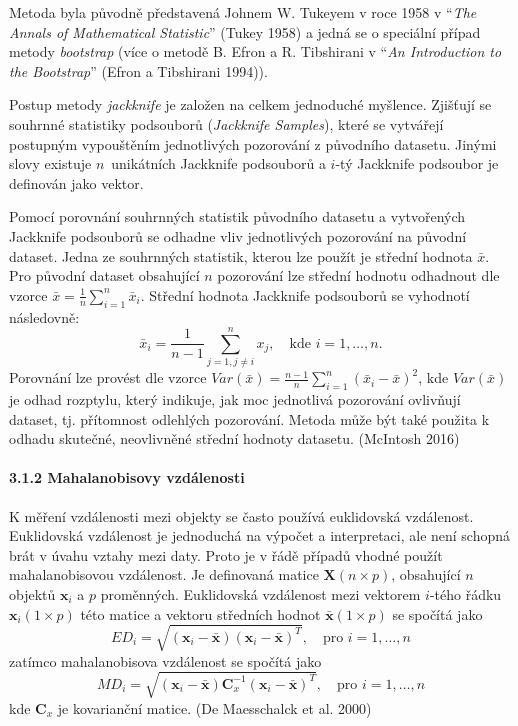 \documentclass[12pt,]{article}
\let\oldparagraph\paragraph
\renewcommand{\paragraph}[1]{\oldparagraph{#1}\mbox{}}
\begin{document}
\qquad Metoda byla původně představená Johnem W. Tukeyem v roce 1958 v
\enquote{\emph{The Annals of Mathematical Statistic}} (Tukey 1958) a
jedná se o speciální případ metody \emph{bootstrap} (více o metodě B.
Efron a R. Tibshirani v \enquote{\emph{An Introduction to the
Bootstrap}} (Efron a Tibshirani 1994)).

\qquad Postup metody \emph{jackknife} je založen na celkem jednoduché
myšlence. Zjišťují se souhrnné statistiky podsouborů (\emph{Jackknife
Samples}), které se vytvářejí postupným vypouštěním jednotlivých
pozorování z původního datasetu. Jinými slovy existuje \(n\)~unikátních
Jackknife podsouborů a \(i\)-tý Jackknife podsoubor je definován jako
vektor.

\qquad Pomocí porovnání souhrnných statistik původního datasetu a
vytvořených Jackknife podsouborů se odhadne vliv jednotlivých pozorování
na původní dataset. Jedna ze souhrnných statistik, kterou lze použít je
střední hodnota \(\bar{x}\). Pro původní dataset obsahující \(n\)
pozorování lze střední hodnotu odhadnout dle vzorce
\(\bar{x} = \frac{1}{n} \sum \limits_{i=1}^{n} \bar{x}_i\). Střední
hodnota Jackknife podsouborů se vyhodnotí následovně:
\[\bar{x}_i = \frac{1}{n-1} \sum \limits_{j=1, j \neq i}^{n} x_j, \quad \text{kde } i=1,\dots,n.\]
Porovnání lze provést dle vzorce
\(\textit{Var}(\bar{x}) = \frac{n-1}{n} \sum \limits_{i=1}^{n}(\bar{x}_i - \bar{x})^2\),
kde \(\textit{Var}(\bar{x})\) je odhad rozptylu, který indikuje, jak moc
jednotlivá pozorování ovlivňují dataset, tj. přítomnost odlehlých
pozorování. Metoda může být také použita k odhadu skutečné, neovlivněné
střední hodnoty datasetu. (McIntosh 2016)

\hypertarget{mbdist}{\paragraph{3.1.2 Mahalanobisovy
vzdálenosti}\label{mbdist}}

\qquad K měření vzdálenosti mezi objekty se často používá euklidovská
vzdálenost. Euklidovská vzdálenost je jednoduchá na výpočet a
interpretaci, ale není schopná brát v úvahu vztahy mezi daty. Proto je v
řádě případů vhodné použít mahalanobisovou vzdálenost. Je definovaná
matice \(\bm{X}(n \times p)\), obsahující \(n\) objektů \(\bm{x}_i\) a
\(p\) proměnných. Euklidovská vzdálenost mezi vektorem \(i\)-tého řádku
\(\bm{x}_i (1 \times p)\) této matice a vektoru středních hodnot
\(\bar{\bm{x}} (1 \times p)\) se spočítá jako
\[ED_i = \sqrt{(\bm{x}_i - \bar{\bm{x}})(\bm{x}_i - \bar{\bm{x}})^T}, \quad \text{pro } i = 1,\dots,n\]
zatímco mahalanobisova vzdálenost se spočítá jako
\[MD_i = \sqrt{(\bm{x}_i - \bar{\bm{x}}) \bm{C}^{-1}_x (\bm{x}_i - \bar{\bm{x}})^T}, \quad \text{pro } i = 1,\dots,n\]
kde \(\bm{C}_x\) je kovarianční matice. (De Maesschalck et al. 2000)
\end{document}
